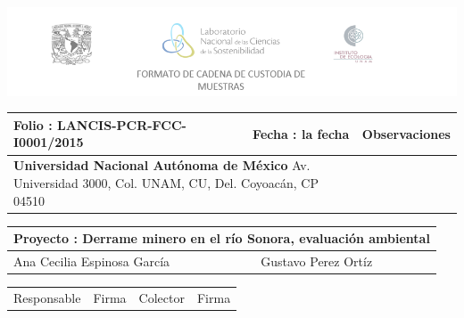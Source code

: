 \documentclass{article}
\begin{document}
\begin{center}
	
	\includegraphics{encabezado.png}

	 \begin{tabular}{ | p{7cm} | p{3.5cm} | p{7cm} |}
	\hline
	Folio : {\color{red}LANCIS-PCR-FCC-I0001/2015} & Fecha : la fecha & Observaciones \\ 	\hline
	
	\multicolumn{2}{|p{10.5cm}|}{\textbf{Universidad Nacional Autónoma de México }\newline 
    Av. Universidad 3000, Col. UNAM, CU, Del. Coyoacán, CP 04510}

	
	
	 &  \\ 	\hline
	
	
	\end{tabular}
	
	\begin{tabular}{ | p{9.1cm} | p{9.1cm} |}
	\hline
	\multicolumn{2}{|p{18.2cm}|}{Proyecto : Derrame minero en el río Sonora, evaluación ambiental}\\
	\hline
	Ana Cecilia Espinosa García & Gustavo Perez Ortíz\\ 	\hline
	\end{tabular} 
	{\color{Gray}
	\begin{tabular}{ p{7cm} p{1cm} p{7cm} p{1cm} }
	Responsable & Firma & Colector & Firma 
	\end{tabular}
	}
	
	\vspace{0.95cm}
	

\end{center}
\end{document}
